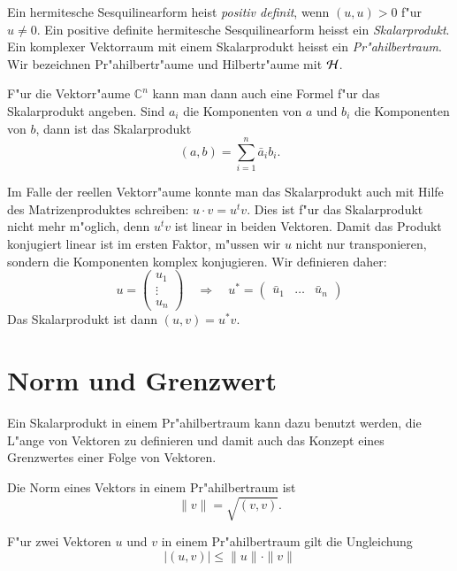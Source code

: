 \begin{definition}
Ein hermitesche Sesquilinearform heist {\em positiv definit}, wenn
$(u,u)>0$ f"ur $u\ne 0$. Ein positive definite hermitesche Sesquilinearform
heisst ein {\em Skalarprodukt}. Ein komplexer Vektorraum mit einem Skalarprodukt
%
%
heisst ein {\em Pr"ahilbertraum}.
%
Wir bezeichnen Pr"ahilbertr"aume und Hilbertr"aume mit ${\cal H}$.
%
%
\end{definition}


F"ur die Vektorr"aume $\mathbb C^n$ kann man dann auch eine Formel
f"ur das Skalarprodukt angeben. Sind $a_i$ die Komponenten von $a$ und
$b_i$ die Komponenten von $b$, dann ist das Skalarprodukt
\[
(a,b)=\sum_{i=1}^n \bar a_ib_i.
\]

Im Falle der reellen Vektorr"aume konnte man das Skalarprodukt
auch mit Hilfe des Matrizenproduktes schreiben: $u\cdot v=u^tv$.
Dies ist f"ur das Skalarprodukt nicht mehr m"oglich, denn $u^tv$
ist linear in beiden Vektoren.
Damit das Produkt konjugiert linear ist im ersten Faktor, m"ussen
wir $u$ nicht nur transponieren, sondern die Komponenten komplex konjugieren.
Wir definieren daher:
\[
u=\begin{pmatrix}u_1\\\vdots\\u_n\end{pmatrix}
\quad\Rightarrow\quad
u^*=\begin{pmatrix}\bar u_1&\dots&\bar u_n\end{pmatrix}
\]
Das Skalarprodukt ist dann $(u,v)=u^*v$.

\section{Norm und Grenzwert}
Ein Skalarprodukt in einem Pr"ahilbertraum kann dazu benutzt werden,
die L"ange von Vektoren zu definieren und damit auch das Konzept eines
Grenzwertes einer Folge von Vektoren.

\begin{definition}
Die Norm eines Vektors in einem Pr"ahilbertraum ist
\[
\| v\| = \sqrt{(v,v)}.
\]
\end{definition}
%

\begin{satz} F"ur zwei Vektoren $u$ und $v$
in einem Pr"ahilbertraum gilt die Ungleichung
\[
|(u,v)| \le \| u\|\cdot \| v\|
\]
%
\end{satz}


